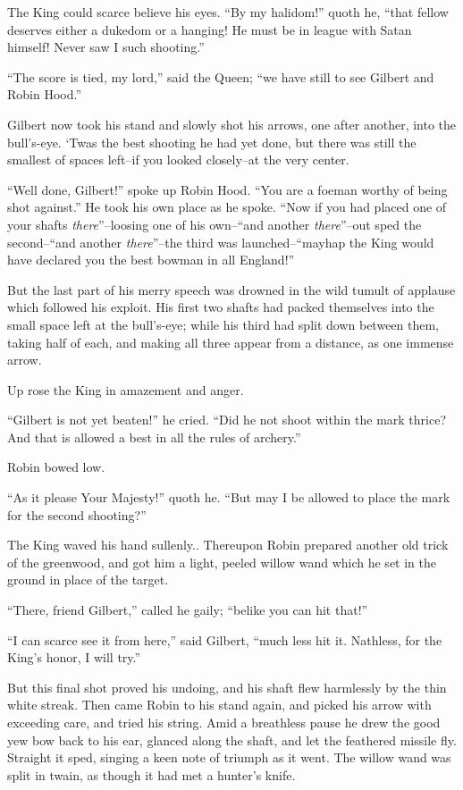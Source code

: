 The King could scarce believe his eyes. ``By my halidom!'' quoth he,
``that fellow deserves either a dukedom or a hanging! He must be in
league with Satan himself! Never saw I such shooting.''

``The score is tied, my lord,'' said the Queen; ``we have still to see
Gilbert and Robin Hood.''

Gilbert now took his stand and slowly shot his arrows, one after
another, into the bull's-eye. `Twas the best shooting he had yet done,
but there was still the smallest of spaces left--if you looked
closely--at the very center.

``Well done, Gilbert!'' spoke up Robin Hood. ``You are a foeman worthy
of being shot against.'' He took his own place as he spoke. ``Now if you
had placed one of your shafts \emph{there}''--loosing one of his
own--``and another \emph{there}''--out sped the second--``and another
\emph{there}''--the third was launched--``mayhap the King would have
declared you the best bowman in all England!''

But the last part of his merry speech was drowned in the wild tumult of
applause which followed his exploit. His first two shafts had packed
themselves into the small space left at the bull's-eye; while his third
had split down between them, taking half of each, and making all three
appear from a distance, as one immense arrow.

Up rose the King in amazement and anger.

``Gilbert is not yet beaten!'' he cried. ``Did he not shoot within the
mark thrice? And that is allowed a best in all the rules of archery.''

Robin bowed low.

``As it please Your Majesty!'' quoth he. ``But may I be allowed to place
the mark for the second shooting?''

The King waved his hand sullenly.. Thereupon Robin prepared another old
trick of the greenwood, and got him a light, peeled willow wand which he
set in the ground in place of the target.

``There, friend Gilbert,'' called he gaily; ``belike you can hit that!''

``I can scarce see it from here,'' said Gilbert, ``much less hit it.
Nathless, for the King's honor, I will try.''

But this final shot proved his undoing, and his shaft flew harmlessly by
the thin white streak. Then came Robin to his stand again, and picked
his arrow with exceeding care, and tried his string. Amid a breathless
pause he drew the good yew bow back to his ear, glanced along the shaft,
and let the feathered missile fly. Straight it sped, singing a keen note
of triumph as it went. The willow wand was split in twain, as though it
had met a hunter's knife.

